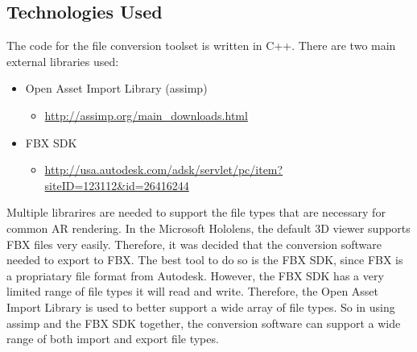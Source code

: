     \subsection{Technologies Used}

    The code for the file conversion toolset is written in C++.  There are two main external libraries used:
    \begin{itemize}
        \item Open Asset Import Library (assimp)
        \begin{itemize}
            \item \url{http://assimp.org/main_downloads.html}
        \end{itemize}

        \item FBX SDK
        \begin{itemize}
            \item \url{http://usa.autodesk.com/adsk/servlet/pc/item?siteID=123112&id=26416244}
        \end{itemize}
    \end{itemize}

    Multiple librarires are needed to support the file types that are necessary for common AR rendering.  In the Microsoft Hololens, the default
    3D viewer supports FBX files very easily.  Therefore, it was decided that the conversion software needed to export to FBX.  The best tool to do 
    so is the FBX SDK, since FBX is a propriatary file format from Autodesk.  However, the FBX SDK has a very limited range of file types it will read and write.
    Therefore, the Open Asset Import Library is used to better support a wide array of file types.  So in using assimp and the FBX SDK together,
    the conversion software can support a wide range of both import and export file types.

